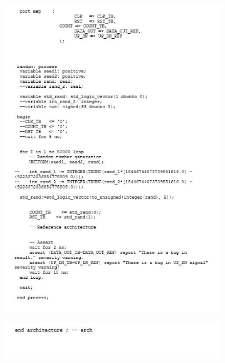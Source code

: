 \begin{figure}[!htb]
	\centering
	\includegraphics[scale=1]{immagini/counter_tb2}
	\label{counter_tb2}
\end{figure}
\begin{figure}[!htb]
	\centering
	\includegraphics[scale=1]{immagini/counter_tb3}
	\label{counter_tb3}
\end{figure}
\newpage
